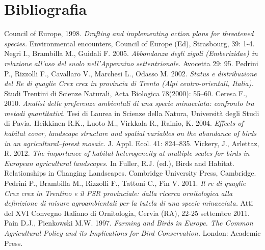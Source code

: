 \documentclass[10pt,twoside,openany,x11names,svgnames,italian,a5paper,dvipsnames,table]{memoir}
\newcommand\chapterillustration{}
\begin{document}
\chapter{Bibliografia}
\renewcommand\chapterillustration{}
\renewcommand*{\bibname}{}
\begingroup
\renewcommand{\addcontentsline}[3]{}%
\renewcommand{\section}[2]{}%
\begin{thebibliography}{99}
\footnotesize
{} Council of Europe, 1998. \emph{Drafting and implementing action plans for threatened species.} Environmental encounters, Council of Europe (Ed), Strasbourg, 39: 1-4.
Negri I., Brambilla M., Guidali F. 2005. \emph{Abbondanza degli zigoli (Emberizidae) in relazione all’uso del suolo nell’Appennino settentrionale.} Avocetta 29: 95.
Pedrini P., Rizzolli F., Cavallaro V., Marchesi L., Odasso M. 2002. \emph{Status e distribuzione del Re di quaglie \emph{Crex crex} in provincia di Trento (Alpi centro-orientali, Italia).} Studi Trentini di Scienze Naturali, Acta Biologica 78(2000): 55–60.
Ceresa F., 2010. \emph{Analisi delle preferenze ambientali di una specie minacciata: confronto tra metodi quantitativi.} Tesi di Laurea in Scienze della Natura, Università degli Studi di Pavia.
Heikkinen R.K., Luoto M., Virkkala R., Rainio, K. 2004. \emph{Effects of habitat cover, landscape structure and spatial variables on the abundance of birds in an agricultural–forest mosaic.} J. Appl. Ecol. 41: 824–835.
Vickery, J., Arlettaz, R. 2012. \emph{The importance of habitat heterogeneity at multiple scales for birds in European agricultural landscapes.} In Fuller, R.J. (ed.), Birds and Habitat. Relationships in Changing Landscapes. Cambridge University Press, Cambridge.
Pedrini P., Brambilla M., Rizzolli F., Tattoni C., Fin V. 2011. \emph{Il re di quaglie \emph{Crex crex} in Trentino e il PSR provinciale: dalla ricerca ornitologica alla definizione di misure agroambientali per la tutela di una specie minacciata.} Atti del XVI Convegno Italiano di Ornitologia, Cervia (RA), 22-25 settembre 2011.
Pain D.J., Pienkowski M.W. 1997. \emph{Farming and Birds in Europe. The Common Agricultural Policy and its Implications for Bird Conservation.} London: Academic Press.

\end{thebibliography}
\end{document}
